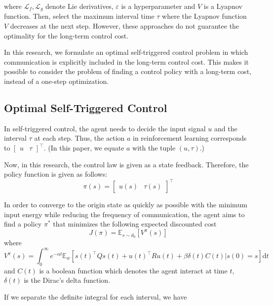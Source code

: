 \documentclass[english, dvipdfmx]{ampmt}             %
\newcommand{\expect}{\mathbb{E}}
\begin{document}
where $\mathcal{L}_f, \mathcal{L}_g$ denote Lie derivatives, $\varepsilon$ is a hyperparameter and $V$ is a Lyapnov function. Then, select the maximum interval time $\tau$ where the Lyapnov function $V$ decreases at the next step. However, these approaches do not guarantee the optimality for the long-term control cost. \par
In this research, we formulate an optimal self-triggered control problem in which communication is explicitly included in the long-term control cost. This makes it possible to consider the problem of finding a control policy with a long-term cost, instead of a one-step optimization.

\subsection{Optimal Self-Triggered Control}
\label{sec:formulation}
In self-triggered control, the agent needs to decide the input signal $u$ and the interval $\tau$ at each step. Thus, the action $a$ in reinforcement learning corresponds to $\begin{bmatrix}u & \tau \end{bmatrix}^{\top}$. (In this paper, we equate $a$ with the tuple $(u,\tau)$.) \par
Now, in this research, the control law is given as a state feedback. Therefore, the policy function is given as follows:
\begin{equation}
	\pi(s) = \begin{bmatrix}u(s) & \tau(s)\end{bmatrix}^{\top}
\end{equation}\par
In order to converge to the origin state as quickly as possible with the minimum input energy while reducing the frequency of communication, the agent aims to find a policy $\pi^{*}$ that minimizes the following expected discounted cost 
\begin{equation}
	J(\pi)=\expect_{s\sim d_0}[V^{\pi}(s)] \label{evaluation}
\end{equation}
where
\begin{equation}
	V^{\pi}(s) = \int_{0}^{\infty} e^{-\alpha t}\expect_{w}[s(t)^{\top}Qs(t)+u(t)^{\top}Ru(t)+\beta \delta(t)C(t)|s(0)=s]\textrm{d}t \label{such_that}
\end{equation}
and $C(t)$ is a boolean function which denotes the agent interact at time $t$, $\delta(t)$ is the Dirac's delta function.\par
If we separate the definite integral for each interval, we have 
\end{document}
